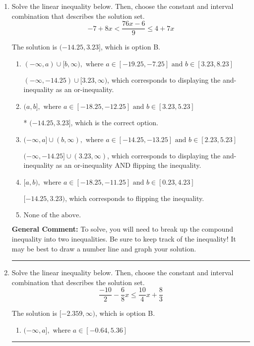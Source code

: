 \documentclass{extbook}[14pt]
\newcommand{\litem}[1]{\item #1

\rule{\textwidth}{0.4pt}}
\begin{document}
\begin{enumerate}
{\begin{enumerate}[label=\Alph*.]
You may have chosen this if you thought the inequality did not match the ends of the intervals.
\end{enumerate}

\textbf{General Comment:} Remember that less/greater than or equal to includes the endpoint, while less/greater do not. Also, remember that you need to flip the inequality when you multiply or divide by a negative.
}
\litem{
Solve the linear inequality below. Then, choose the constant and interval combination that describes the solution set.
\[ -7 + 8 x < \frac{76 x - 6}{9} \leq 4 + 7 x \]

The solution is \( (-14.25, 3.23] \), which is option B.\begin{enumerate}[label=\Alph*.]
\item \( (-\infty, a) \cup [b, \infty), \text{ where } a \in [-19.25, -7.25] \text{ and } b \in [3.23, 8.23] \)

$(-\infty, -14.25) \cup [3.23, \infty)$, which corresponds to displaying the and-inequality as an or-inequality.
\item \( (a, b], \text{ where } a \in [-18.25, -12.25] \text{ and } b \in [3.23, 5.23] \)

* $(-14.25, 3.23]$, which is the correct option.
\item \( (-\infty, a] \cup (b, \infty), \text{ where } a \in [-14.25, -13.25] \text{ and } b \in [2.23, 5.23] \)

$(-\infty, -14.25] \cup (3.23, \infty)$, which corresponds to displaying the and-inequality as an or-inequality AND flipping the inequality.
\item \( [a, b), \text{ where } a \in [-18.25, -11.25] \text{ and } b \in [0.23, 4.23] \)

$[-14.25, 3.23)$, which corresponds to flipping the inequality.
\item \( \text{None of the above.} \)


\end{enumerate}

\textbf{General Comment:} To solve, you will need to break up the compound inequality into two inequalities. Be sure to keep track of the inequality! It may be best to draw a number line and graph your solution.
}
\litem{
Solve the linear inequality below. Then, choose the constant and interval combination that describes the solution set.
\[ \frac{-10}{2} - \frac{6}{8} x \leq \frac{10}{4} x + \frac{8}{3} \]

The solution is \( [-2.359, \infty) \), which is option B.\begin{enumerate}[label=\Alph*.]
\item \( (-\infty, a], \text{ where } a \in [-0.64, 5.36] \)


\end{enumerate}}
\end{enumerate}
\end{document}
